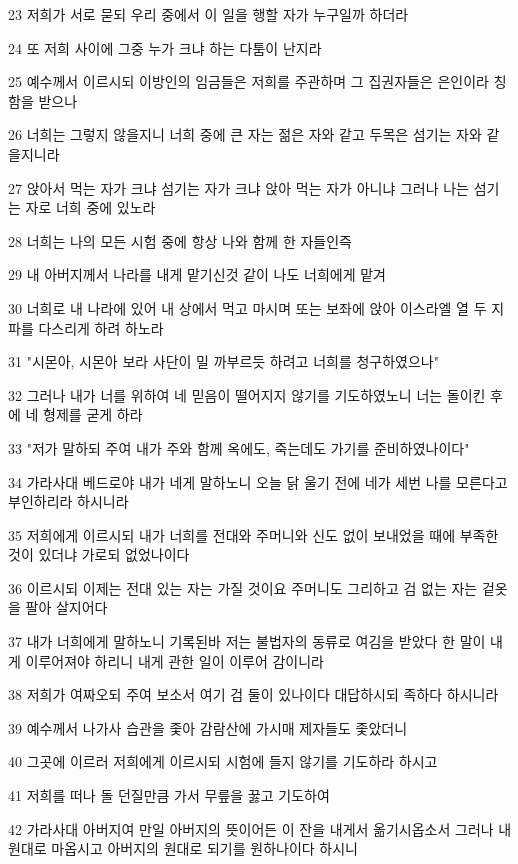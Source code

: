 \par 23 저희가 서로 묻되 우리 중에서 이 일을 행할 자가 누구일까 하더라
\par 24 또 저희 사이에 그중 누가 크냐 하는 다툼이 난지라
\par 25 예수께서 이르시되 이방인의 임금들은 저희를 주관하며 그 집권자들은 은인이라 칭함을 받으나
\par 26 너희는 그렇지 않을지니 너희 중에 큰 자는 젊은 자와 같고 두목은 섬기는 자와 같을지니라
\par 27 앉아서 먹는 자가 크냐 섬기는 자가 크냐 앉아 먹는 자가 아니냐 그러나 나는 섬기는 자로 너희 중에 있노라
\par 28 너희는 나의 모든 시험 중에 항상 나와 함께 한 자들인즉
\par 29 내 아버지께서 나라를 내게 맡기신것 같이 나도 너희에게 맡겨
\par 30 너희로 내 나라에 있어 내 상에서 먹고 마시며 또는 보좌에 앉아 이스라엘 열 두 지파를 다스리게 하려 하노라
\par 31 "시몬아, 시몬아 보라 사단이 밀 까부르듯 하려고 너희를 청구하였으나"
\par 32 그러나 내가 너를 위하여 네 믿음이 떨어지지 않기를 기도하였노니 너는 돌이킨 후에 네 형제를 굳게 하라
\par 33 "저가 말하되 주여 내가 주와 함께 옥에도, 죽는데도 가기를 준비하였나이다"
\par 34 가라사대 베드로야 내가 네게 말하노니 오늘 닭 울기 전에 네가 세번 나를 모른다고 부인하리라 하시니라
\par 35 저희에게 이르시되 내가 너희를 전대와 주머니와 신도 없이 보내었을 때에 부족한 것이 있더냐 가로되 없었나이다
\par 36 이르시되 이제는 전대 있는 자는 가질 것이요 주머니도 그리하고 검 없는 자는 겉옷을 팔아 살지어다
\par 37 내가 너희에게 말하노니 기록된바 저는 불법자의 동류로 여김을 받았다 한 말이 내게 이루어져야 하리니 내게 관한 일이 이루어 감이니라
\par 38 저희가 여짜오되 주여 보소서 여기 검 둘이 있나이다 대답하시되 족하다 하시니라
\par 39 예수께서 나가사 습관을 좇아 감람산에 가시매 제자들도 좇았더니
\par 40 그곳에 이르러 저희에게 이르시되 시험에 들지 않기를 기도하라 하시고
\par 41 저희를 떠나 돌 던질만큼 가서 무릎을 꿇고 기도하여
\par 42 가라사대 아버지여 만일 아버지의 뜻이어든 이 잔을 내게서 옮기시옵소서 그러나 내 원대로 마옵시고 아버지의 원대로 되기를 원하나이다 하시니
